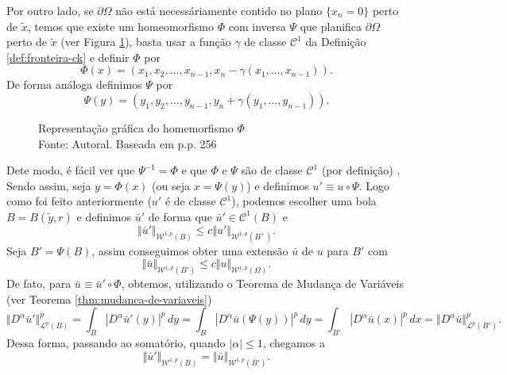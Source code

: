 \documentclass[a4paper, 11pt]{book}
\theoremstyle{definition}
\newcommand{\cC}{\mathcal{C}}
\newcommand{\cL}{\mathcal{L}}
\newcommand{\cW}{\mathcal{W}}
\begin{document}
\begin{prf}
    Por outro lado, se $\partial\Omega$ não está necessáriamente contido no plano $\{x_n = 0\}$ perto de $\tilde x$, temos que existe um homeomorfismo $\Phi$ com inversa $\Psi$ que planifica $\partial \Omega$ perto de $\tilde x$ (ver Figura \ref{fig:homeomorfismo}),  basta usar a função $\gamma$ de classe $\cC^1$ da Definição \ref{def:fronteira-ck} e definir $\Phi$ por
    \begin{equation} \label{eq:Phi}
        \Phi(x) = (x_1,x_2,...,x_{n-1}, x_n - \gamma(x_1,\dots,x_{n-1})).
    \end{equation}
    De forma análoga definimos $\Psi$ por
    \begin{equation} \label{eq:Psi}
        \Psi(y) = (y_1,y_2,\dots,y_{n-1},y_n + \gamma(y_1,\dots,y_{n-1})).
    \end{equation}
    \begin{figure} \label{fig:homeomorfismo}
        \centering
        
        \caption{Representação gráfica do homemorfismo $\Phi$\\Fonte: Autoral. Baseada em \cite{evans-pde} p.p. 256}
    \end{figure}
    Dete modo, é fácil ver que $\Psi^{-1} = \Phi$ e que $\Phi$ e $\Psi$ são de classe $\cC^1$ (por definição) . Sendo assim, seja $y = \Phi(x)$ (ou seja $x = \Psi(y)$) e definimos $u' \equiv u \circ \Psi$. Logo como foi feito anteriormente ($u'$ é de classe $\cC^1$), podemos escolher uma bola $B = B(\tilde y, r)$ e definimos $\bar u'$ de forma que $\bar u' \in \cC^1(B)$ e
    \begin{equation} \label{eq:BBBB}
        \Vert \bar u' \Vert_{\cW^{1,p}(B)} \leqslant c \Vert u' \Vert_{\cW^{1,p}(B^+)}.
    \end{equation}
    Seja $B' = \Psi(B)$, assim conseguimos obter uma extensão $\bar u$ de $u$ para $B'$ com
    \[
        \Vert \bar u \Vert_{\cW^{1,p}(B')} \leqslant c \Vert u \Vert_{\cW^{1,p}(\Omega)}.
    \]
    De fato, para $\bar u \equiv \bar u' \circ \Phi$, obtemos, utilizando o Teorema de Mudança de Variáveis (ver Teorema \ref{thm:mudanca-de-variaveis})
    \[
        \Vert D^\alpha \bar u' \Vert_{\cL^p(B)}^p = \int_B |D^\alpha \bar u'(y)|^p \,dy = \int_B |D^\alpha \bar u (\Psi (y))|^p \,dy = \int_{B'} |D^\alpha \bar u (x)|^p \,dx = \Vert D^\alpha \bar u \Vert_{\cL^p(B')}^p.
    \]
    Dessa forma, passando ao somatório, quando $|\alpha| \leqslant 1$, chegamos a
    \begin{equation} \label{eq:normaBigualnormaW}
        \Vert \bar u' \Vert_{\cW^{1,p}(B)} = \Vert  \bar u \Vert_{\cW^{1,p}(B')}.

\end{equation}
\end{prf}
\end{document}

